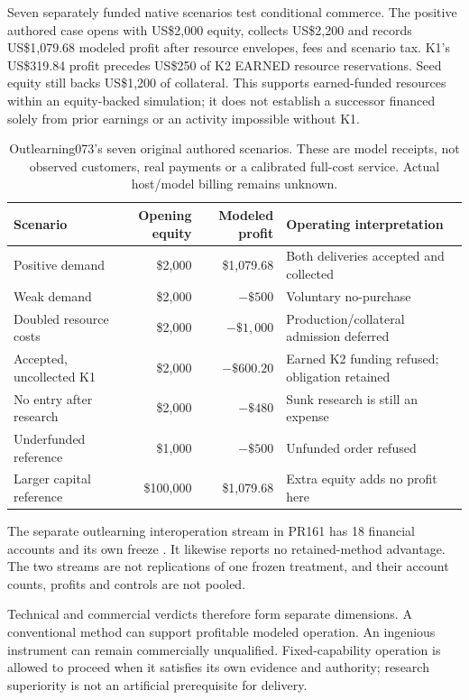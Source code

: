 \documentclass[11pt,letterpaper]{article}
\begin{document}
Seven separately funded native scenarios test conditional commerce. The positive authored case opens with US\$2,000 equity, collects US\$2,200 and records US\$1,079.68 modeled profit after resource envelopes, fees and scenario tax. K1's US\$319.84 profit precedes US\$250 of K2 EARNED resource reservations. Seed equity still backs US\$1,200 of collateral. This supports earned-funded resources within an equity-backed simulation; it does not establish a successor financed solely from prior earnings or an activity impossible without K1.

\begin{table}[htbp]\centering\small
\begin{tabularx}{\linewidth}{@{}YrrP{4.2cm}@{}}\toprule
Scenario & Opening equity & Modeled profit & Operating interpretation\\\midrule
Positive demand & \$2,000 & \$1,079.68 & Both deliveries accepted and collected\\
Weak demand & \$2,000 & $-\$500$ & Voluntary no-purchase\\
Doubled resource costs & \$2,000 & $-\$1,000$ & Production/collateral admission deferred\\
Accepted, uncollected K1 & \$2,000 & $-\$600.20$ & Earned K2 funding refused; obligation retained\\
No entry after research & \$2,000 & $-\$480$ & Sunk research is still an expense\\
Underfunded reference & \$1,000 & $-\$500$ & Unfunded order refused\\
Larger capital reference & \$100,000 & \$1,079.68 & Extra equity adds no profit here\\\bottomrule
\end{tabularx}
\caption{Outlearning073's seven original authored scenarios. These are model receipts, not observed customers, real payments or a calibrated full-cost service. Actual host/model billing remains unknown.}\label{tab:outlearning}
\end{table}

The separate outlearning interoperation stream in PR161 has 18 financial accounts and its own freeze \cite{outlearning906}. It likewise reports no retained-method advantage. The two streams are not replications of one frozen treatment, and their account counts, profits and controls are not pooled.

Technical and commercial verdicts therefore form separate dimensions. A conventional method can support profitable modeled operation. An ingenious instrument can remain commercially unqualified. Fixed-capability operation is allowed to proceed when it satisfies its own evidence and authority; research superiority is not an artificial prerequisite for delivery.
\end{document}

